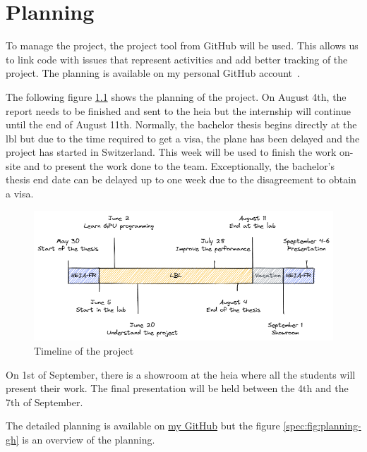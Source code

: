 \chapter{Planning}
\label{spec:ch:planning}

To manage the project, the project tool from GitHub will be used.
This allows us to link code with issues that represent activities and add better tracking of the project.
The planning is available on my personal GitHub account~\cite{github-project}.

The following figure \ref{spec:fig:timeline} shows the planning of the project.
On August 4th, the report needs to be finished and sent to the \acrshort{heia} but the internship will continue until the end of August 11th.
Normally, the bachelor thesis begins directly at the \acrshort{lbl} but due to the time required to get a visa, the plane has been delayed and the project has started in Switzerland.
This week will be used to finish the work on-site and to present the work done to the team.
Exceptionally, the bachelor's thesis end date can be delayed up to one week due to the disagreement to obtain a visa.

\begin{figure}[ht]
    \centering
    \includegraphics[width=\textwidth]{05-resources/img/spec/planning.excalidraw.png}
    \caption{Timeline of the project}
    \label{spec:fig:timeline}
\end{figure}


On 1st of September, there is a showroom at the \acrshort{heia} where all the students will present their work.
The final presentation will be held between the 4th and the 7th of September.

The detailed planning is available on \href{https://github.com/users/simbarras/projects/3/views/1}{my GitHub} but the figure \ref{spec:fig:planning-gh} is an overview of the planning.

